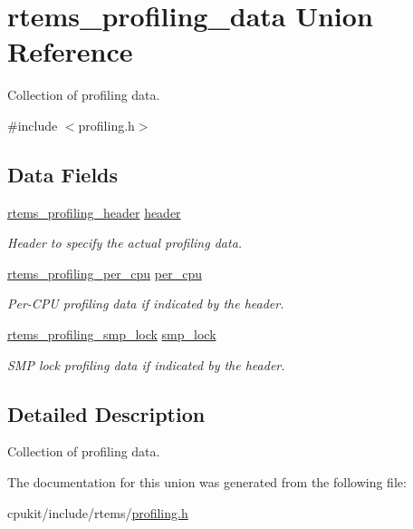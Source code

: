 \hypertarget{unionrtems__profiling__data}{}\section{rtems\+\_\+profiling\+\_\+data Union Reference}
\label{unionrtems__profiling__data}


Collection of profiling data.  




{\ttfamily \#include $<$profiling.\+h$>$}

\subsection*{Data Fields}
\begin{DoxyCompactItemize}
\item 
\mbox{\label{unionrtems__profiling__data_abbd26195cdd3e6ed89bf420f50dae750}} 
\mbox{\hyperlink{structrtems__profiling__header}{rtems\+\_\+profiling\+\_\+header}} \mbox{\hyperlink{unionrtems__profiling__data_abbd26195cdd3e6ed89bf420f50dae750}{header}}
\begin{DoxyCompactList}\small\item\em Header to specify the actual profiling data. \end{DoxyCompactList}\item 
\mbox{\label{unionrtems__profiling__data_a20d893c02700700499b812aa1e1d57de}} 
\mbox{\hyperlink{structrtems__profiling__per__cpu}{rtems\+\_\+profiling\+\_\+per\+\_\+cpu}} \mbox{\hyperlink{unionrtems__profiling__data_a20d893c02700700499b812aa1e1d57de}{per\+\_\+cpu}}
\begin{DoxyCompactList}\small\item\em Per-\/\+C\+PU profiling data if indicated by the header. \end{DoxyCompactList}\item 
\mbox{\label{unionrtems__profiling__data_a3540f6dd1fe5474d986fc351bde78556}} 
\mbox{\hyperlink{structrtems__profiling__smp__lock}{rtems\+\_\+profiling\+\_\+smp\+\_\+lock}} \mbox{\hyperlink{unionrtems__profiling__data_a3540f6dd1fe5474d986fc351bde78556}{smp\+\_\+lock}}
\begin{DoxyCompactList}\small\item\em S\+MP lock profiling data if indicated by the header. \end{DoxyCompactList}\end{DoxyCompactItemize}


\subsection{Detailed Description}
Collection of profiling data. 

The documentation for this union was generated from the following file\+:\begin{DoxyCompactItemize}
\item 
cpukit/include/rtems/\mbox{\hyperlink{profiling_8h}{profiling.\+h}}\end{DoxyCompactItemize}
